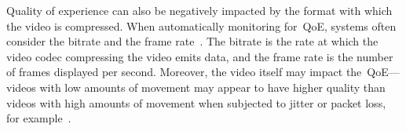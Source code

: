         Quality of experience can also be negatively impacted by the format with which the video is compressed. When automatically monitoring for~QoE, systems often consider the bitrate and the frame rate~\autocite{ChenYanjiao2015FQtQ}. The bitrate is the rate at which the video codec compressing the video emits data, and the frame rate is the number of frames displayed per second. Moreover, the video itself may impact the~QoE---videos with low amounts of movement may appear to have higher quality than videos with high amounts of movement when subjected to jitter or packet loss, for example~\autocite{ChenYanjiao2015FQtQ}.
